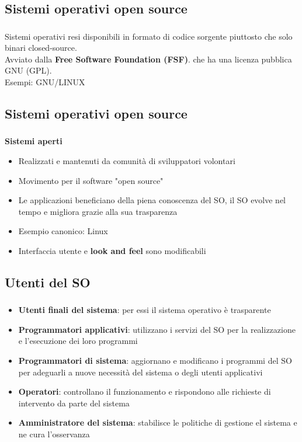 \documentclass{beamer}
\newenvironment{mainframe}{
	\begin{frame}
		\frametitle{\insertsubsection}
		\framesubtitle{\insertsection}
	}{
	\end{frame}
}
\begin{document}
\subsection{Sistemi operativi open source}
\begin{mainframe}
	Sistemi operativi resi disponibili in formato di codice sorgente piuttosto che solo binari closed-source.\\
	Avviato dalla \textbf{Free Software Foundation (FSF)}. che ha una licenza pubblica GNU (GPL).\\
	Esempi: GNU/LINUX
\end{mainframe}
\subsection{Sistemi operativi open source}
\begin{mainframe}
	\textbf{Sistemi aperti}
	\begin{itemize}
		\item Realizzati e mantenuti da comunità di sviluppatori volontari
		\item Movimento per il software "open source"
		\item Le applicazioni beneficiano della piena conoscenza del SO, il SO evolve nel tempo e migliora grazie alla sua trasparenza
		\item Esempio canonico: Linux
		\item Interfaccia utente e \textbf{look and feel} sono modificabili
	\end{itemize}
\end{mainframe}
\subsection{Utenti del SO}
\begin{mainframe}
	\begin{itemize}
		\item \textbf{Utenti finali del sistema}: per essi il sistema operativo è trasparente
		\item \textbf{Programmatori applicativi}: utilizzano i servizi del SO per la realizzazione e l'esecuzione dei loro programmi
		\item \textbf{Programmatori di sistema}: aggiornano e modificano i programmi del SO per adeguarli a nuove necessità del sistema o degli utenti applicativi
		\item \textbf{Operatori}: controllano il funzionamento e rispondono alle richieste di intervento da parte del sistema
		\item \textbf{Amministratore del sistema}: stabilisce le politiche di gestione el sistema e ne cura l'osservanza
	\end{itemize}
\end{mainframe}
\end{document}
